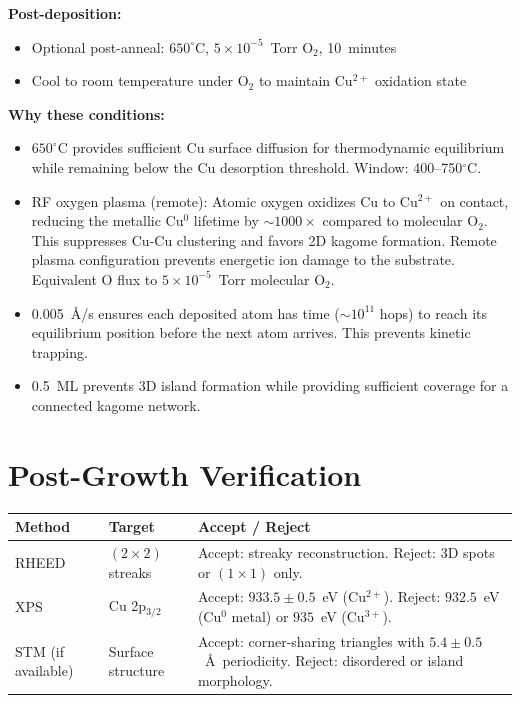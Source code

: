 \documentclass[11pt, a4paper]{article}
\begin{document}
\textbf{Post-deposition:}
\begin{itemize}[nosep]
  \item Optional post-anneal: $650^\circ$C,
        $5 \times 10^{-5}$~Torr O$_2$, 10~minutes
  \item Cool to room temperature under O$_2$ to maintain
        Cu$^{2+}$ oxidation state
\end{itemize}

\textbf{Why these conditions:}
\begin{itemize}[nosep]
  \item $650^\circ$C provides sufficient Cu surface diffusion
        for thermodynamic equilibrium while remaining below the
        Cu desorption threshold. Window: 400--750$^\circ$C.
  \item RF oxygen plasma (remote): Atomic oxygen oxidizes Cu
        to Cu$^{2+}$ on contact, reducing the metallic Cu$^0$
        lifetime by $\sim 1000\times$ compared to molecular
        O$_2$. This suppresses Cu-Cu clustering and favors
        2D kagome formation. Remote plasma configuration
        prevents energetic ion damage to the substrate.
        Equivalent O flux to $5 \times 10^{-5}$~Torr
        molecular O$_2$.
  \item 0.005~\AA/s ensures each deposited atom has time
        ($\sim 10^{11}$ hops) to reach its equilibrium position
        before the next atom arrives. This prevents kinetic
        trapping.
  \item 0.5~ML prevents 3D island formation while providing
        sufficient coverage for a connected kagome network.
\end{itemize}

\section{Post-Growth Verification}

\begin{center}
\begin{tabular}{@{}llp{6cm}@{}}
\toprule
\textbf{Method} & \textbf{Target} & \textbf{Accept / Reject} \\
\midrule
RHEED & $(2 \times 2)$ streaks &
  Accept: streaky reconstruction.
  Reject: 3D spots or $(1 \times 1)$ only. \\
XPS & Cu 2p$_{3/2}$ &
  Accept: $933.5 \pm 0.5$~eV (Cu$^{2+}$).
  Reject: $932.5$~eV (Cu$^0$ metal) or
  $935$~eV (Cu$^{3+}$). \\
STM (if available) & Surface structure &
  Accept: corner-sharing triangles with
  $5.4 \pm 0.5$~\AA\ periodicity.
  Reject: disordered or island morphology. \\
\bottomrule
\end{tabular}
\end{center}
\end{document}
